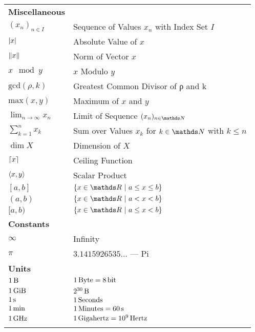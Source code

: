 \documentclass[crop=false,10pt,ngerman]{standalone}
\begin{document}
{\begin{tabularx}{\textwidth}{p{}p{}}
      \textbf{Miscellaneous} & \\
      $(x_n)_{n\in I}$ & Sequence of Values $x_n$ with Index Set $I$ \\
      $\left| x \right|$ & Absolute Value of $x$ \\
      $\left\| x \right\|$ & Norm of Vector $x$ \\
      $x \mod y$ & $x$ Modulo $y$ \\
      $\mathrm{gcd}(ρ,k)$ & Greatest Common Divisor of ρ and k \\
      $\mathrm{max}(x,y)$ & Maximum of $x$ and $y$ \\
      $\lim_{n\to\infty} x_n$ & Limit of Sequence $(x_n)_{n\in\setNatural}$ \\
      $\sum_{k=1}^n x_k$ & Sum over Values $x_k$ for $k\in\setNatural$ with $k\leq n$ \\
      $\dim X$ & Dimension of $X$ \\
      $\left\lceil x \right\rceil$ & Ceiling Function \\
      $\left\langle x,y \right\rangle$ & Scalar Product \\
      $[a,b]$ & $\set{x\in\setReal}{a\leq x \leq b}$ \\
      $(a,b)$ & $\set{x\in\setReal}{a < x < b}$ \\
      $[a,b)$ & $\set{x\in\setReal}{a\leq x < b}$ \\

      \hline


      \textbf{Constants} & \\
      $\infty$ & Infinity \\
      $π$ & $3.1415926535\ldots$ --- Pi \\

      \hline

      \textbf{Units} & \\
      $1\, \mathrm{B}$ & $1\, \mathrm{Byte} = 8\, \mathrm{bit}$ \\
      $1\, \mathrm{GiB}$ & $2^{30}\, \mathrm{B}$ \\
      $1\, \mathrm{s}$ & $1\, \mathrm{Seconds}$ \\
      $1\, \mathrm{min}$ & $1\, \mathrm{Minutes} = 60\, \mathrm{s}$ \\
      $1\, \mathrm{GHz}$ & $1\, \mathrm{Gigahertz} = 10^9\, \mathrm{Hertz}$ \\

      \\
      \hline
    \end{tabularx}
  }
\end{document}
